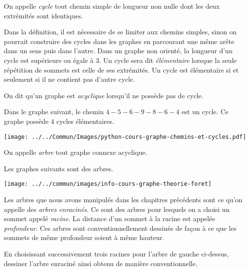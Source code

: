 \documentclass{magnolia}
\begin{document}
\begin{definition}
On appelle \emph{cycle} tout chemin simple de longueur non nulle dont les deux
extrémités sont identiques.
\end{definition}
  
\begin{remarques}
\remarque Dans la définition, il est nécessaire de se limiter aux chemins simples, sinon
  on pourrait construire des \og cycles \fg dans les graphes 
  en parcourant une même arête dans un sens puis dans l'autre.
\remarque Dans un graphe non orienté, la longueur d'un cycle est supérieure ou égale à 3.
\remarque Un cycle sera dit \emph{élémentaire} lorsque la seule répétition de sommets est celle de
  ses extrémités. Un cycle est élémentaire si et seulement si il ne contient pas
  d'autre cycle.
\item On dit qu'un graphe est \emph{acyclique} lorsqu'il ne possède pas de cycle.
\end{remarques}

\begin{exempleUnique}
\exemple Dans le graphe suivant, le chemin $4- 5- 6- 9- 8- 6- 4$ est un cycle. Ce graphe possède 4 cycles élémentaires.
\begin{center}
  \texttt{[image: ../../Commun/Images/python-cours-graphe-chemins-et-cycles.pdf]}
\end{center}
\end{exempleUnique}

\begin{definition}
On appelle \emph{arbre} tout graphe connexe acyclique.
\end{definition}

\begin{remarques}
\remarque Les graphes suivants sont des arbres.
\begin{center}
\texttt{[image: ../../commun/images/info-cours-graphe-theorie-foret]}
\end{center}
\remarque Les arbres que nous avons manipulés dans les chapitres précédents sont ce
  qu'on appelle des \emph{arbres enracinés}. Ce sont des arbres
  pour lesquels on a choisi un sommet appelé \emph{racine}. 
  La distance d'un sommet à la racine est appelée \emph{profondeur}.
  Ces arbres sont conventionnellement dessinés de façon à ce que les sommets de même
  profondeur soient à même hauteur.
\end{remarques}
\vspace{2ex}
\begin{exoUnique}
\exo En choisissant successivement trois racines pour l'arbre de gauche ci-dessus, dessiner
  l'arbre enraciné ainsi obtenu de manière conventionnelle.
\end{exoUnique}
\end{document}
